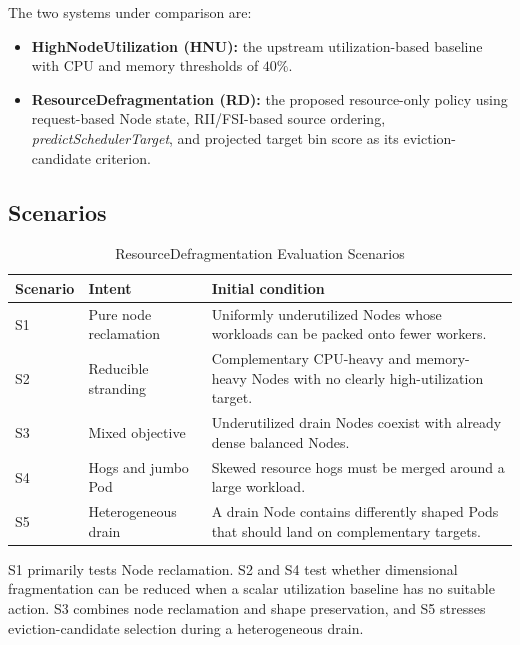 The two systems under comparison are:

\begin{itemize}
    \item \textbf{HighNodeUtilization (HNU):} the upstream utilization-based baseline with CPU and memory thresholds of \(40\%\).
    \item \textbf{ResourceDefragmentation (RD):} the proposed resource-only policy using request-based Node state, RII/FSI-based source ordering, \textit{predictSchedulerTarget}, and projected target bin score as its eviction-candidate criterion.
\end{itemize}

\subsection{Scenarios}
\label{sec:defrag_scenarios}

\begin{table}[tbp]
    \centering
    \caption{ResourceDefragmentation Evaluation Scenarios}
    \label{tab:defrag_scenarios}
    \small
    \renewcommand{\arraystretch}{1.2}
    \begin{tabular}{l p{3.6cm} p{7.4cm}}
        \hline
        \textbf{Scenario} & \textbf{Intent} & \textbf{Initial condition} \\
        \hline
        S1 & Pure node reclamation & Uniformly underutilized Nodes whose workloads can be packed onto fewer workers. \\
        S2 & Reducible stranding & Complementary CPU-heavy and memory-heavy Nodes with no clearly high-utilization target. \\
        S3 & Mixed objective & Underutilized drain Nodes coexist with already dense balanced Nodes. \\
        S4 & Hogs and jumbo Pod & Skewed resource hogs must be merged around a large workload. \\
        S5 & Heterogeneous drain & A drain Node contains differently shaped Pods that should land on complementary targets. \\
        \hline
    \end{tabular}
\end{table}

S1 primarily tests Node reclamation. S2 and S4 test whether dimensional fragmentation can be reduced when a scalar utilization baseline has no suitable action. S3 combines node reclamation and shape preservation, and S5 stresses eviction-candidate selection during a heterogeneous drain.

